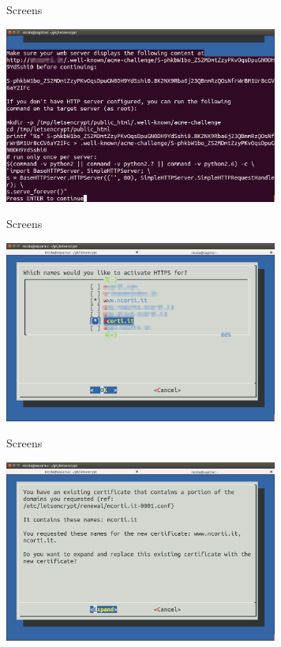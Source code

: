 \documentclass[xcolor=svgnames,11pt]{beamer}
\begin{document}
\begin{frame}{Screens}
\begin{center}
\includegraphics[width=9cm]{img/screen4.png}
\end{center}
\end{frame}
\begin{frame}{Screens}
\begin{center}
\includegraphics[width=9cm]{img/screen5.png}
\end{center}
\end{frame}
\begin{frame}{Screens}
\begin{center}
\includegraphics[width=9cm]{img/screen6.png}
\end{center}
\end{frame}
\end{document}
